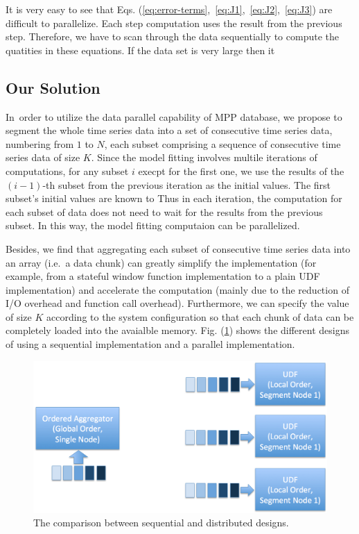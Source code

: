 \documentclass[english,10pt]{llncs}
\begin{document}
It is very easy to see that Eqs.
(\ref{eq:error-terms},~\ref{eq:J1},~\ref{eq:J2},~\ref{eq:J3}) are
difficult to parallelize. Each step computation uses the result from
the previous step. Therefore, we have to scan through the data
sequentially to compute the quatities in these equations. If the data
set is very large then it 

\subsection{Our Solution}


In\ order to utilize the data parallel capability of MPP database, we
propose to segment the whole time series data into a set of
consecutive time series data, numbering from $1$ to $N$, each subset
comprising a sequence of consecutive time series data of size
$K$. Since the model fitting involves multile iterations of
computations, for any subset $i$ execpt for the first one, we use the
results of the $(i-1)$-th subset from the previous iteration as the
initial values. The first subset's initial values are known to Thus in
each iteration, the computation for each subset of data does not need
to wait for the results from the previous subset. In this way, the
model fitting computaion can be parallelized. 

Besides, we find that aggregating each subset of consecutive time
series data into an array (i.e.\ a data chunk) can greatly simplify
the implementation (for example, from a stateful window function
implementation to a plain UDF implementation) and accelerate the
computation (mainly due to the reduction of I/O overhead and function
call overhead). Furthermore, we can specify the value of size $K$
according to the system configuration so that each chunk of data can
be completely loaded into the avaialble
memory. Fig. (\ref{fig:seq_vs_dist}) shows the different designs of
using a sequential implementation and a parallel implementation. 

\begin{figure}[ht]
  \begin{centering}
    \includegraphics[scale=0.25]{sequential_vs_distributed.png}
  \end{centering}
  \caption{\label{fig:seq_vs_dist} The comparison between sequential
    and distributed designs. }
\end{figure}
\end{document}
